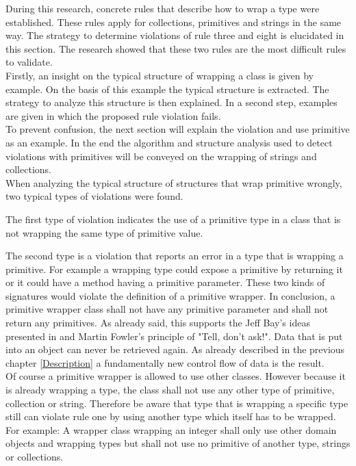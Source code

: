 During this research, concrete rules that describe how to wrap a type were established. These rules apply for collections, primitives and strings in the same way. The strategy to determine violations of rule three and eight is elucidated in this section. The research showed that these two rules are the most difficult rules to validate.
\\

Firstly, an insight on the typical structure of wrapping a class is given by example. On the basis of this example the typical structure is extracted. The strategy to analyze this structure is then explained. In a second step, examples are given in which the proposed rule violation fails. 
\\

To prevent confusion, the next section will explain the violation and use primitive as an example. In the end the algorithm and structure analysis used to detect violations with primitives will be conveyed on the wrapping of strings and collections.
\\

When analyzing the typical structure of structures that wrap primitive wrongly, two typical types of violations were found. 

The first type of violation indicates the use of a primitive type in a class that is not wrapping the same type of primitive value. 

The second type is a violation that reports an error in a type that is wrapping a primitive. For example a wrapping type could expose a primitive by returning it or it could have a method having a primitive parameter. These two kinds of signatures would violate the definition of a primitive wrapper. In conclusion, a primitive wrapper class shall not have any primitive parameter and shall not return any primitives. As already said, this supports the Jeff Bay's ideas presented in \cite{oc2008} and Martin Fowler's principle of "Tell, don't ask!"\cite{telldontaskoriginal}. Data that is put into an object can never be retrieved again. As already described in the previous chapter \ref{Description} a fundamentally new control flow of data is the result.
\\

Of course a primitive wrapper is allowed to use other classes. However because it is already wrapping a type, the class shall not use any other type of primitive, collection or string. Therefore be aware that type that is wrapping a specific type still can violate rule one by using another type which itself has to be wrapped. For example: A wrapper class wrapping an integer shall only use other domain objects and wrapping types but shall not use no primitive of another type, strings or collections. 
\\


